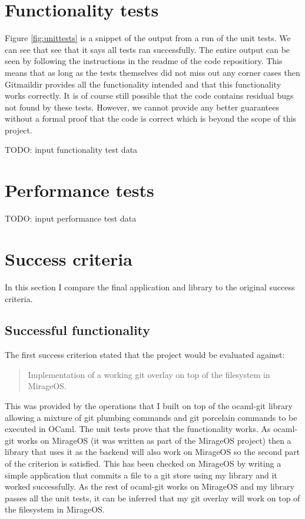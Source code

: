 \section{Functionality tests}

Figure \ref{fig:unittests} is a snippet of the output from a run of the unit tests. We can see that see that it says all tests ran successfully. The entire output can be seen by following the instructions in the readme of the code repositiory. This means that as long as the tests themselves did not miss out any corner cases then Gitmaildir provides all the functionality intended and that this functionality works correctly. It is of course still possible that the code contains residual bugs not found by these tests. However, we cannot provide any better guarantees without a formal proof that the code is correct which is beyond the scope of this project.

TODO: input functionality test data

\section{Performance tests}

TODO: input performance test data

\section{Success criteria}

In this section I compare the final application and library to the original success criteria.

\subsection{Successful functionality}

The first success criterion stated that the project would be evaluated against:

\begin{quote}
  Implementation of a working git overlay on top of the filesystem in MirageOS.
\end{quote}

This was provided by the operations that I built on top of the ocaml-git library allowing a mixture of git plumbing commands and git porcelain commands to be executed in OCaml. The unit tests prove that the functionality works. As ocaml-git works on MirageOS (it was written as part of the MirageOS project) then a library that uses it as the backend will also work on MirageOS so the second part of the criterion is satisfied. This has been checked on MirageOS by writing a simple application that commits a file to a git store using my library and it worked successfully. As the rest of ocaml-git works on MirageOS and my library passes all the unit tests, it can be inferred that my git overlay will work on top of the filesystem in MirageOS.


